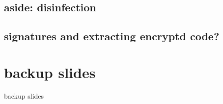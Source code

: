 \subsection{aside: disinfection}

\subsection{signatures and extracting encryptd code?}



\section{backup slides}
\begin{frame}{backup slides}
\end{frame}





